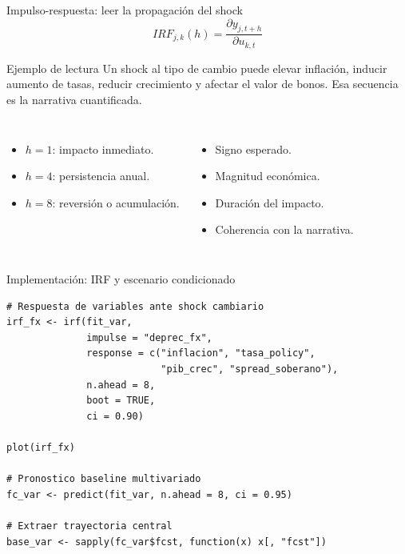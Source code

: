 \documentclass[10pt,aspectratio=169]{beamer}
\begin{document}
\begin{frame}{Impulso-respuesta: leer la propagación del shock}
\[
IRF_{j,k}(h) = \frac{\partial y_{j,t+h}}{\partial u_{k,t}}
\]

\begin{block}{Ejemplo de lectura}
Un shock al tipo de cambio puede elevar inflación, inducir aumento de tasas, reducir crecimiento y afectar el valor de bonos. Esa secuencia es la narrativa cuantificada.
\end{block}

\begin{columns}
\begin{itemize}
  \item $h=1$: impacto inmediato.
  \item $h=4$: persistencia anual.
  \item $h=8$: reversión o acumulación.
\end{itemize}

\begin{itemize}
  \item Signo esperado.
  \item Magnitud económica.
  \item Duración del impacto.
  \item Coherencia con la narrativa.
\end{itemize}
\end{columns}
\end{frame}

\begin{frame}[fragile]{Implementación: IRF y escenario condicionado}
\begin{lstlisting}
# Respuesta de variables ante shock cambiario
irf_fx <- irf(fit_var,
              impulse = "deprec_fx",
              response = c("inflacion", "tasa_policy",
                           "pib_crec", "spread_soberano"),
              n.ahead = 8,
              boot = TRUE,
              ci = 0.90)

plot(irf_fx)

# Pronostico baseline multivariado
fc_var <- predict(fit_var, n.ahead = 8, ci = 0.95)

# Extraer trayectoria central
base_var <- sapply(fc_var$fcst, function(x) x[, "fcst"])
\end{lstlisting}
\end{frame}
\end{document}

